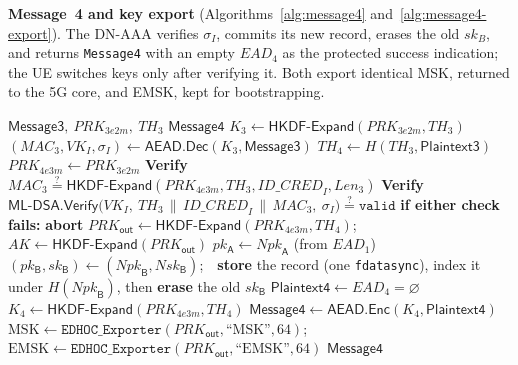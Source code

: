 \documentclass[symmetry,article,submit,moreauthors]{Definitions/mdpi}
\begin{document}
\textbf{Message~4 and key export} (Algorithms~\ref{alg:message4} and~\ref{alg:message4-export}). The DN-AAA verifies $\sigma_I$, commits its new record, erases the old $sk_B$, and returns \texttt{Message4} with an empty $\mathit{EAD}_4$ as the protected success indication; the UE switches keys only after verifying it. Both export identical MSK, returned to the 5G core, and EMSK, kept for bootstrapping.

\begin{algorithm}[H]
\caption{EDHOC \texttt{Message4} (DN-AAA $\to$ UE)}
\label{alg:message4}
{\footnotesize
\begin{algorithmic}[1]
\Require $\mathsf{Message3},\ PRK_{3e2m},\ TH_3$
\Ensure $\mathsf{Message4}$
\State $K_3 \gets \mathsf{HKDF\text{-}Expand}(PRK_{3e2m}, TH_3)$
\State $(\mathit{MAC}_3, VK_I, \sigma_I) \gets \mathsf{AEAD.Dec}(K_3, \mathsf{Message3})$
\State $TH_4 \gets H(TH_3, \mathsf{Plaintext3})$
\State $PRK_{4e3m} \gets PRK_{3e2m}$
\State \textbf{Verify} $\mathit{MAC}_3 \overset{?}{=} \mathsf{HKDF\text{-}Expand}(PRK_{4e3m}, TH_3, \mathit{ID\_CRED}_I, \mathit{Len}_3)$ 
\State \textbf{Verify} $\mathsf{ML\text{-}DSA.Verify}\big(VK_I,\ TH_3 \,\|\, \mathit{ID\_CRED}_I \,\|\, \mathit{MAC}_3,\ \sigma_I\big) \overset{?}{=} \mathtt{valid}$ 
\State \textbf{if either check fails:} \textbf{abort}
\State $PRK_{\mathsf{out}} \gets \mathsf{HKDF\text{-}Expand}(PRK_{4e3m}, TH_4)$;\ \ $AK \gets \mathsf{HKDF\text{-}Expand}(PRK_{\mathsf{out}})$
\State $pk_{\mathsf{A}} \gets \mathit{Npk}_{\mathsf{A}}$ (from $\mathit{EAD}_1$) 
\State $(pk_{\mathsf{B}}, sk_{\mathsf{B}}) \gets (\mathit{Npk}_{\mathsf{B}}, \mathit{Nsk}_{\mathsf{B}})$;\ \ \textbf{store} the record (one \texttt{fdatasync}), index it under $H(\mathit{Npk}_{\mathsf{B}})$, then \textbf{erase} the old $sk_{\mathsf{B}}$ 
\State $\mathsf{Plaintext4} \gets \mathit{EAD}_4 = \varnothing$ 
\State $K_4 \gets \mathsf{HKDF\text{-}Expand}(PRK_{4e3m}, TH_4)$
\State $\mathsf{Message4} \gets \mathsf{AEAD.Enc}(K_4, \mathsf{Plaintext4})$
\State $\mathrm{MSK} \gets \mathtt{EDHOC\_Exporter}(PRK_{\mathsf{out}}, \text{``MSK''}, 64)$;\ \ $\mathrm{EMSK} \gets \mathtt{EDHOC\_Exporter}(PRK_{\mathsf{out}}, \text{``EMSK''}, 64)$
\State \Return $\mathsf{Message4}$
\end{algorithmic}
}
\end{algorithm}
\end{document}
